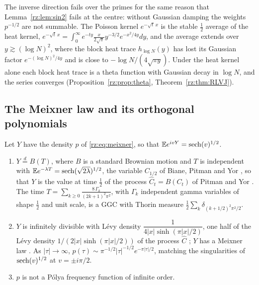 The inverse direction fails over the primes for the same reason that Lemma~\ref{rz:lem:sin2} fails at the centre: without Gaussian damping the weights $p^{-1/2}$ are not summable. The Poisson kernel $e^{-\sqrt t\,x}$ is the stable $\frac12$ average of the heat kernel, $e^{-\sqrt t\,x}=\int_0^\infty e^{-ty}\frac{x}{2\sqrt\pi}y^{-3/2}e^{-x^2/4y}dy$, and the average extends over $y\gtrsim(\log N)^2$, where the block heat trace $h_{\log N}(y)$ has lost its Gaussian factor $e^{-(\log N)^2/4y}$ and is close to $-\log N/(4\sqrt{\pi y})$. Under the heat kernel alone each block heat trace is a theta function with Gaussian decay in $\log N$, and the series converges (Proposition~\ref{rz:prop:theta}, Theorem~\ref{rz:thm:RLVJ}).

\subsection{The Meixner law and its orthogonal polynomials}\label{rz:sec:meixner}

Let $Y$ have the density $p$ of \eqref{rz:eq:meixner}, so that $\mathbb{E} e^{ivY}=\operatorname{sech}(v)^{1/2}$.

\begin{proposition}\label{rz:prop:meixstruct}
\begin{enumerate}
\item[(i)] $Y\overset d=B(T)$, where $B$ is a standard Brownian motion and $T$ is independent with $\mathbb{E} e^{-\lambda T}=\operatorname{sech}(\sqrt{2\lambda})^{1/2}$, the variable $C_{1/2}$ of Biane, Pitman and Yor \cite{BPY01}, so that $Y$ is the value at time $\frac12$ of the process $\widehat C_t=B(C_t)$ of Pitman and Yor \cite[(1) and (4)]{PitmanYor03}. The time $T=\sum_{k\ge0}\frac{8\,\Gamma_k}{(2k+1)^2\pi^2}$, with $\Gamma_k$ independent gamma variables of shape $\frac12$ and unit scale, is a GGC with Thorin measure $\frac12\sum_k\delta_{(k+1/2)^2\pi^2/2}$.
\item[(ii)] $Y$ is infinitely divisible with L\'evy density $\dfrac{1}{4|x|\sinh(\pi|x|/2)}$, one half of the L\'evy density $1/(2|x|\sinh(\pi|x|/2))$ of the process $\widehat C$ \cite[Table~5]{PitmanYor03}; $Y$ has a Meixner law \cite{SchoutensTeugels98,Grigelionis99}. As $|\tau|\to\infty$, $p(\tau)\sim\pi^{-1/2}|\tau|^{-1/2}e^{-\pi|\tau|/2}$, matching the singularities of $\operatorname{sech}(v)^{1/2}$ at $v=\pm i\pi/2$.
\item[(iii)] $p$ is not a P\'olya frequency function of infinite order.
\end{enumerate}
\end{proposition}

